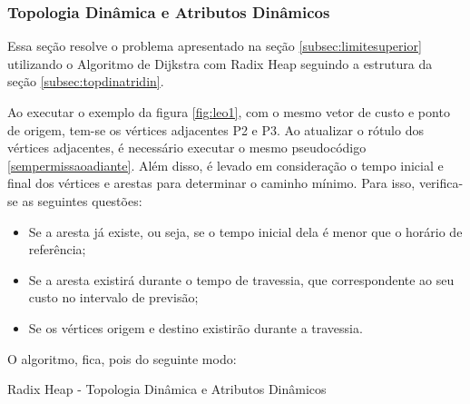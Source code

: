 \subsubsection{Topologia Dinâmica e Atributos Dinâmicos}
Essa seção resolve o problema apresentado na seção \ref{subsec:limitesuperior} utilizando o Algoritmo de
Dijkstra com Radix Heap seguindo a estrutura da seção \ref{subsec:topdinatridin}.

Ao executar o exemplo da figura \ref{fig:leo1}, com o mesmo vetor de custo e ponto de origem, tem-se
os vértices adjacentes P2 e P3. Ao atualizar o rótulo dos vértices adjacentes, é necessário executar o mesmo
pseudocódigo \ref{sempermissaoadiante}. Além disso, é levado em consideração o tempo
inicial e final dos vértices e arestas para determinar o caminho mínimo. Para isso,
verifica-se as seguintes questões:
\begin{itemize}
\item Se a aresta já existe, ou seja, se o tempo inicial dela é menor que o horário de referência;
\item Se a aresta existirá durante o tempo de travessia, que correspondente ao seu custo no intervalo de previsão;
\item Se os vértices origem e destino existirão durante a travessia.
\end{itemize}
\FloatBarrier

O algoritmo, fica, pois do seguinte modo:

\begin{algorithm}[h!]
\caption{Radix Heap - Topologia Dinâmica e Atributos Dinâmicos}
\label{algtudodinamico}
\end{algorithm}
\FloatBarrier

